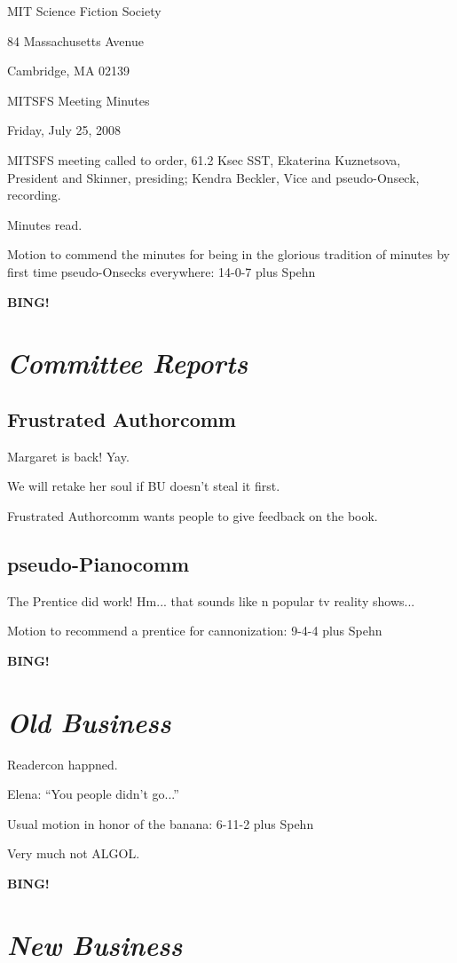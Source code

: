 \documentclass[10pt]{article}
\newcommand{\bing}{{\bf BING!} }
\newcommand{\goto}[1]{\bing \vskip 12pt \section*{{\em{#1}}}}
\newcommand{\ps}{ plus Spehn\xspace}
\begin{document}
\begin{center}

MIT Science Fiction Society

84 Massachusetts Avenue

Cambridge, MA 02139

\vspace{12pt}

MITSFS Meeting Minutes

Friday, July 25, 2008

\end{center}

\vspace{18pt}

\setlength{\parskip}{6pt}

\noindent
MITSFS meeting called to order, 61.2 Ksec SST,
Ekaterina Kuznetsova, President and Skinner, presiding; Kendra Beckler, Vice and pseudo-Onseck, recording.

Minutes read.

Motion to commend the minutes for being in the glorious tradition of minutes by first time pseudo-Onsecks everywhere: 14-0-7 \ps

\BING

\goto{Committee Reports}

\subsection*{Frustrated Authorcomm}
Margaret is back!  Yay.

We will retake her soul if BU doesn't steal it first.

Frustrated Authorcomm wants people to give feedback on the book.

\subsection*{pseudo-Pianocomm}

The Prentice did work!  Hm... that sounds like n popular tv reality shows...

Motion to recommend a prentice for cannonization: 9-4-4 \ps

\goto{Old Business}

Readercon happned.

Elena: ``You people didn't go...''

Usual motion in honor of the banana: 6-11-2 \ps

Very much not ALGOL.

\goto{New Business}
\end{document}
